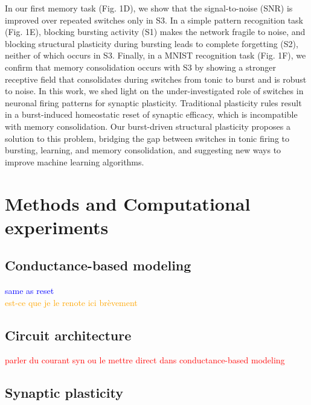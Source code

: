 In our first memory task (Fig. 1D), we show that the signal-to-noise (SNR) is improved over repeated switches only in S3. In a simple pattern recognition task (Fig. 1E), blocking bursting activity (S1) makes the network fragile to noise, and blocking structural plasticity during bursting leads to complete forgetting (S2), neither of which occurs in S3. Finally, in a MNIST recognition task (Fig. 1F), we confirm that memory consolidation occurs with S3 by showing a stronger receptive field that consolidates during switches from tonic to burst and is robust to noise. 
In this work, we shed light on the under-investigated role of switches in neuronal firing patterns for synaptic plasticity. Traditional plasticity rules result in a burst-induced homeostatic reset of synaptic efficacy, which is incompatible with memory consolidation. Our burst-driven structural plasticity proposes a solution to this problem, bridging the gap between switches in tonic firing to bursting, learning, and memory consolidation, and suggesting new ways to improve machine learning algorithms. 




%
%

\section{Methods and Computational experiments}
\subsection{Conductance-based modeling}
\textcolor{blue}{same as reset}\\
\textcolor{orange}{est-ce que je le renote ici brèvement}

\subsection{Circuit architecture}
\textcolor{red}{parler du courant syn ou le mettre direct dans conductance-based modeling}
\subsection{Synaptic plasticity}
